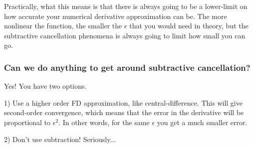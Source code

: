 \documentclass[conf]{new-aiaa}
\begin{document}
    Practically, what this means is that there is always going to be a lower-limit on how accurate your numerical derivative approximation can be. 
    The more nonlinear the function, the smaller the $\epsilon$ that you would need in theory, but the subtractive cancellation phenomena is always going to limit how small you can go. 

    \subsubsection*{Can we do anything to get around subtractive cancellation?}

    Yes! You have two options. 

    1) Use a higher order FD approximation, like central-difference. 
    This will give second-order convergence, which means that the error in the derivative will be proportional to $\epsilon^2$. 
    In other words, for the same $\epsilon$ you get a much smaller error. 

    2) Don't use subtraction! Seriously...
\end{document}
